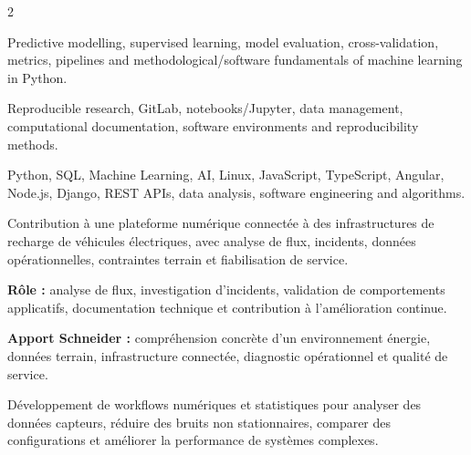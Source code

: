 \documentclass[8pt,a4paper,ragged2e,withhyper]{altacv}
\begin{document}
\begin{paracol}{2}


\small{
Predictive modelling, supervised learning, model evaluation, cross-validation, metrics, pipelines and methodological/software fundamentals of machine learning in Python.
}

\divider


\small{
Reproducible research, GitLab, notebooks/Jupyter, data management, computational documentation, software environments and reproducibility methods.
}

\divider


\small{
Python, SQL, Machine Learning, AI, Linux, JavaScript, TypeScript, Angular, Node.js, Django, REST APIs, data analysis, software engineering and algorithms.
}

\end{paracol}



Contribution à une plateforme numérique connectée à des infrastructures de recharge de véhicules électriques, avec analyse de flux, incidents, données opérationnelles, contraintes terrain et fiabilisation de service.

\textbf{Rôle :} analyse de flux, investigation d'incidents, validation de comportements applicatifs, documentation technique et contribution à l'amélioration continue.

\textbf{Apport Schneider :} compréhension concrète d'un environnement énergie, données terrain, infrastructure connectée, diagnostic opérationnel et qualité de service.

\divider


Développement de workflows numériques et statistiques pour analyser des données capteurs, réduire des bruits non stationnaires, comparer des configurations et améliorer la performance de systèmes complexes.
\end{document}
